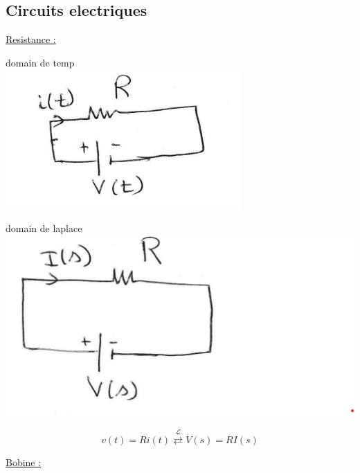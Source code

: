 \documentclass[12pt]{book}
\newcommand{\lagrange}{\mathcal{L}}
\begin{document}
            \subsection{Circuits electriques}
                \underline{Resistance :}
                \begin{center}
                    \begin{minipage}{0,49\linewidth}
                        domain de temp \\
                        \includegraphics[width=\linewidth]{pic/resistance1.png}
                    \end{minipage}
                    \begin{minipage}{0,49\linewidth}
                        domain de laplace \\
                        \includegraphics[width=\linewidth]{pic/resistance2.png}
                    \end{minipage}
                    $$ v(t) = Ri(t) \overset{\lagrange}{\rightleftarrows}V(s)=RI(s) $$
                \end{center} 
                \pagebreak
                \underline{Bobine :}
\end{document}
